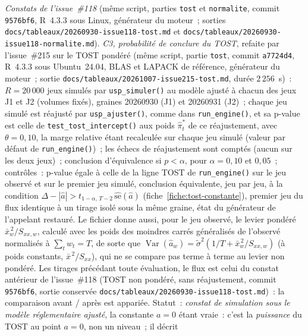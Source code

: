 \documentclass[a4paper,11pt]{article}
\newcommand{\code}[1]{\texttt{\small #1}}
\begin{document}
\noindent\emph{Constats de l'issue~\#118} (même script, parties \code{tost} et \code{normalite},
commit \code{9576bf6}, R~4.3.3 sous Linux, générateur du moteur~; sorties
\code{docs/tableaux/}\newline \code{20260930-issue118-tost.md} et
\code{docs/tableaux/}\newline \code{20260930-issue118-normalite.md}). \emph{C3, probabilité de
conclure du TOST}, refaite par l'issue~\#215 sur le TOST pondéré (même script, partie \code{tost},
commit \code{a7724d4}, R~4.3.3 sous Ubuntu~24.04, BLAS et LAPACK de référence, générateur du
moteur~; sortie \code{docs/tableaux/}\newline \code{20261007-issue215-tost.md}, durée $2\,256$~s)~:
$R = 20\,000$ jeux simulés par \code{usp\_simuler()} au modèle ajusté à chacun des jeux J1 et J2
(volumes fixés), graines 20260930 (J1) et 20260931 (J2)~; chaque jeu simulé est réajusté par
\code{usp\_ajuster()}, comme dans \code{run\_engine()}, et sa p-value est celle de
\code{test\_tost\_intercept()} aux poids $\hat\pi^{*}_t$ de ce réajustement, avec $\theta = 0{,}10$,
la marge relative étant recalculée sur chaque jeu simulé (valeur par défaut de
\code{run\_engine()})~; les échecs de réajustement sont comptés (aucun sur les deux jeux)~;
conclusion d'équivalence si $p < \alpha$, pour $\alpha = 0{,}10$ et $0{,}05$~; contrôles~: p-value égale à
celle de la ligne TOST de \code{run\_engine()} sur le jeu observé et sur le premier jeu simulé,
conclusion équivalente, jeu par jeu, à la condition $\Delta - |\hat a| > t_{1-\alpha,\,T-2}\,
\widehat{\mathrm{se}}(\hat a)$ (fiche~\ref{fiche:tost-constante}), premier jeu du flux identique à
un tirage isolé sous la même graine, état du générateur de l'appelant restauré. Le fichier donne
aussi, pour le jeu observé, le levier pondéré $\bar x_w^{\,2}/S_{xx,w}$, calculé avec les poids
des moindres carrés généralisés de l'observé normalisés à $\sum_t w_t = T$, de sorte que
$\operatorname{Var}(\hat a_w) = \tilde\sigma^2(1/T + \bar x_w^{\,2}/S_{xx,w})$ (à poids constants,
$\bar x^{\,2}/S_{xx}$), qui ne se compare pas terme à terme au levier non pondéré. Les tirages
précédant toute évaluation, le flux est celui du constat antérieur de l'issue~\#118 (TOST non
pondéré, sans réajustement, commit \code{9576bf6}, sortie conservée
\code{docs/tableaux/}\newline \code{20260930-issue118-tost.md})~: la comparaison avant / après est
appariée. Statut~: \emph{constat de simulation sous le modèle réglementaire ajusté}, la constante
$a = 0$ étant vraie~: c'est la \emph{puissance} du TOST au point $a = 0$, non un niveau~; il décrit
\end{document}
